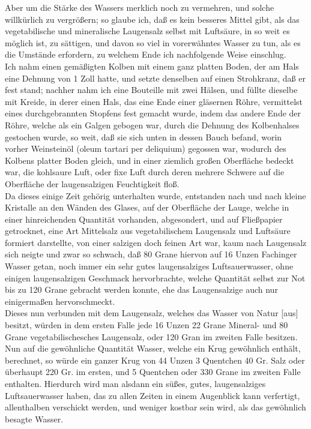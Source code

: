 \documentclass[11pt,a5paper,twoside]{memoir}
\begin{document}
Aber um die Stärke des Wassers merklich noch zu vermehren,
und solche willkürlich zu vergrößern;
so glaube ich, daß es kein besseres Mittel gibt,
als das vegetabilische und mineralische Laugensalz selbst mit Luftsäure,
in so weit es möglich ist, zu sättigen,
und davon so viel in vorerwähntes Wasser zu tun,
als es die Umstände erfordern,
zu welchem Ende ich nachfolgende Weise einschlug.\\

Ich nahm einen gemäßigten Kolben mit einem ganz platten Boden,
der am Hals eine Dehnung von 1 Zoll hatte,
und setzte denselben auf einen Strohkranz,
daß er fest stand;
nachher nahm ich eine Bouteille mit zwei Hälsen,
und füllte dieselbe mit Kreide,
in derer einen Hals, das eine Ende einer gläsernen Röhre,
vermittelst eines durchgebrannten Stopfens fest gemacht wurde,
indem das andere Ende der Röhre,
welche als ein Galgen gebogen war,
durch die Dehnung des Kolbenhalses gestochen wurde,
so weit, daß sie sich unten in dessen Bauch befand,
worin vorher Weinsteinöl%
({\lattext oleum tartari per deliquium})
gegossen war,
wodurch des Kolbens platter Boden gleich,
und in einer ziemlich großen Oberfläche bedeckt war,
die kohlsaure Luft, oder fixe Luft
durch deren mehrere Schwere auf die Oberfläche
der laugensalzigen Feuchtigkeit floß.\\

Da dieses einige Zeit gehörig unterhalten wurde,
entstanden nach und nach kleine Kristalle an den Wänden des Glases,
auf der Oberfläche der Lauge,
welche in einer hinreichenden Quantität vorhanden,
abgesondert, und auf Fließpapier getrocknet,
eine Art Mittelsalz aus vegetabilischem Laugensalz
und Luftsäure formiert darstellte,
von einer salzigen doch feinen Art war,
kaum nach Laugensalz sich neigte%
und zwar so schwach,
daß 80 Grane hiervon auf 16 Unzen Fachinger Wasser getan,
noch immer ein sehr gutes laugensalziges Luftsauerwasser,
ohne einigen laugensalzigen Geschmack hervorbrachte,
welche Quantität selbst zur Not bis zu 120 Grane gebracht werden konnte,
ehe das Laugensalzige auch nur einigermaßen hervorschmeckt.\\

Dieses nun verbunden mit dem Laugensalz,
welches das Wasser von Natur [aus] besitzt,
würden in dem ersten Falle jede 16 Unzen
22 Grane Mineral-
und 80 Grane vegetabilischesches Laugensalz,
oder 120 Gran im zweiten Falle besitzen.
Nun auf die gewöhnliche Quantität Wasser,
welche ein Krug gewöhnlich enthält, berechnet,
so würde ein ganzer Krug von 44 Unzen
3 Quentchen 40 Gr. Salz
oder überhaupt 220 Gr. im ersten,
und 5 Quentchen
oder 330 Grane im zweiten Falle enthalten.
\label{units_value_page}
Hierdurch wird man alsdann ein süßes, gutes,
laugensalziges Luftsauerwasser haben,
das zu allen Zeiten in einem Augenblick kann verfertigt,
allenthalben verschickt werden,
und weniger kostbar
sein wird,
als das gewöhnlich besagte Wasser.\\
\end{document}
